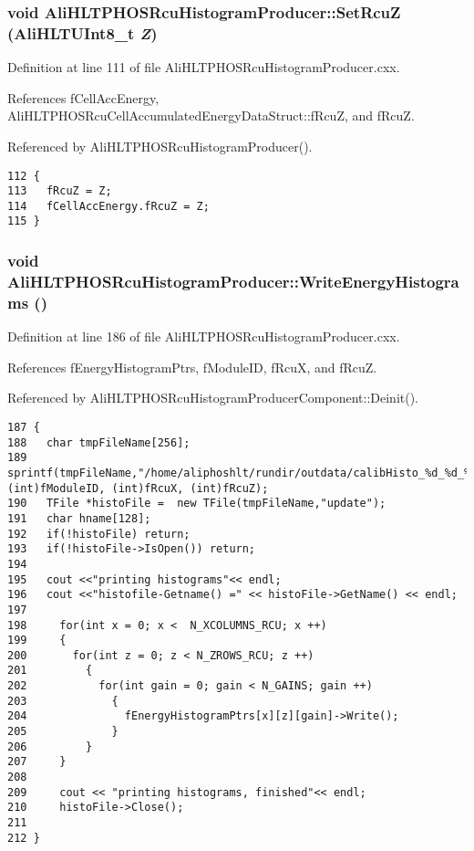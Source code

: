 \subsubsection{\setlength{\rightskip}{0pt plus 5cm}void Ali\-HLTPHOSRcu\-Histogram\-Producer::Set\-Rcu\-Z ({\bf Ali\-HLTUInt8\_\-t} {\em Z})}\label{classAliHLTPHOSRcuHistogramProducer_a9}




Definition at line 111 of file Ali\-HLTPHOSRcu\-Histogram\-Producer.cxx.

References f\-Cell\-Acc\-Energy, Ali\-HLTPHOSRcu\-Cell\-Accumulated\-Energy\-Data\-Struct::f\-Rcu\-Z, and f\-Rcu\-Z.

Referenced by Ali\-HLTPHOSRcu\-Histogram\-Producer().

\footnotesize\begin{verbatim}112 {
113   fRcuZ = Z; 
114   fCellAccEnergy.fRcuZ = Z;
115 }
\end{verbatim}\normalsize 


\subsubsection{\setlength{\rightskip}{0pt plus 5cm}void Ali\-HLTPHOSRcu\-Histogram\-Producer::Write\-Energy\-Histograms ()}\label{classAliHLTPHOSRcuHistogramProducer_a14}




Definition at line 186 of file Ali\-HLTPHOSRcu\-Histogram\-Producer.cxx.

References f\-Energy\-Histogram\-Ptrs, f\-Module\-ID, f\-Rcu\-X, and f\-Rcu\-Z.

Referenced by Ali\-HLTPHOSRcu\-Histogram\-Producer\-Component::Deinit().

\footnotesize\begin{verbatim}187 {
188   char tmpFileName[256];
189   sprintf(tmpFileName,"/home/aliphoshlt/rundir/outdata/calibHisto_%d_%d_%d.root", (int)fModuleID, (int)fRcuX, (int)fRcuZ);
190   TFile *histoFile =  new TFile(tmpFileName,"update");
191   char hname[128];
192   if(!histoFile) return;
193   if(!histoFile->IsOpen()) return;
194 
195   cout <<"printing histograms"<< endl;
196   cout <<"histofile-Getname() =" << histoFile->GetName() << endl;
197 
198     for(int x = 0; x <  N_XCOLUMNS_RCU; x ++)
199     {
200       for(int z = 0; z < N_ZROWS_RCU; z ++)
201         {
202           for(int gain = 0; gain < N_GAINS; gain ++)
203             {
204               fEnergyHistogramPtrs[x][z][gain]->Write();
205             }
206         } 
207     }
208 
209     cout << "printing histograms, finished"<< endl;
210     histoFile->Close();
211 
212 }
\end{verbatim}\normalsize 




